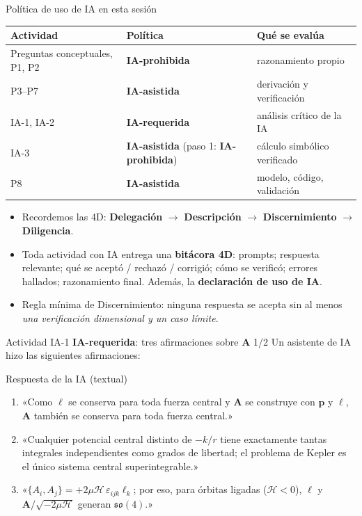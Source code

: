 \documentclass[aspectratio=169]{beamer}
\newcommand{\vp}{\mathbf p}
\newcommand{\vA}{\mathbf A}
\newcommand{\vl}{\boldsymbol\ell}
\newcommand{\PB}[2]{\{#1,#2\}}
\newcommand{\Hc}{\mathcal H}
\newcommand{\IAprohibida}{\colorbox{red!20}{\scriptsize\textbf{IA-prohibida}}}
\newcommand{\IAasistida}{\colorbox{yellow!30}{\scriptsize\textbf{IA-asistida}}}
\newcommand{\IArequerida}{\colorbox{green!20}{\scriptsize\textbf{IA-requerida}}}
\begin{document}
\begin{frame}{Política de uso de IA en esta sesión}
\footnotesize
\begin{center}
\begin{tabular}{lll}
\toprule
Actividad & Política & Qué se evalúa \\
\midrule
Preguntas conceptuales, P1, P2 & \IAprohibida & razonamiento propio \\
P3–P7 & \IAasistida & derivación y verificación \\
IA-1, IA-2 & \IArequerida & análisis crítico de la IA \\
IA-3 & \IAasistida{} (paso 1: \IAprohibida) & cálculo simbólico verificado \\
P8 & \IAasistida & modelo, código, validación \\
\bottomrule
\end{tabular}
\end{center}
\begin{itemize}
  \item<2-> Recordemos las 4D: \textbf{Delegación} $\to$ \textbf{Descripción} $\to$
        \textbf{Discernimiento} $\to$ \textbf{Diligencia}.
  \item<3-> Toda actividad con IA entrega una \textbf{bitácora 4D}: prompts; respuesta
        relevante; qué se aceptó / rechazó / corrigió; cómo se verificó; errores hallados;
        razonamiento final. Además, la \textbf{declaración de uso de IA}.
  \item<4-> Regla mínima de Discernimiento: ninguna respuesta se acepta sin al menos
        \emph{una verificación dimensional y un caso límite}.
\end{itemize}
\end{frame}

\begin{frame}{Actividad IA-1 \IArequerida: tres afirmaciones sobre $\vA$ 1/2}
Un asistente de IA hizo las siguientes afirmaciones:
\begin{exampleblock}{Respuesta de la IA (textual)}
\small
\begin{enumerate}
  \item «Como $\vl$ se conserva para toda fuerza central y $\vA$ se construye con $\vp$ y $\vl$,
        $\vA$ también se conserva para toda fuerza central.»
  \item «Cualquier potencial central distinto de $-k/r$ tiene exactamente tantas integrales
        independientes como grados de libertad; el problema de Kepler es el único sistema
        central superintegrable.»
  \item «$\PB{A_i}{A_j}=+2\mu\Hc\,\varepsilon_{ijk}\ell_k$; por eso, para órbitas ligadas
        ($\Hc<0$), $\vl$ y $\vA/\sqrt{-2\mu\Hc}$ generan $\mathfrak{so}(4)$.»
\end{enumerate}
\end{exampleblock}
\end{frame}
\end{document}
